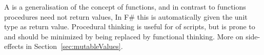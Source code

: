 A  is a generalisation of the concept of functions, and in contrast to functions procedures need not return values,
%
In F\# this is automatically given the unit type as return value. Procedural thinking is useful for  of scripts, but is prone to  and should be minimized by being replaced by functional thinking. More on side-effects in Section~\ref{sec:mutableValues}.


